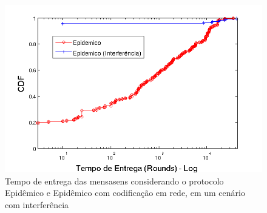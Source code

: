 \begin{figure}[ht]
\centering
\includegraphics[width=.7\textwidth]{img/tempo_epidemico_interferencia.png}
\caption{Tempo de entrega das mensasens considerando o protocolo
Epidêmico e Epidêmico com codificação em rede, em um cenário com
interferência}
\label{fig:Epidemico_EpidemicoNetCode_interf}
\end{figure}


